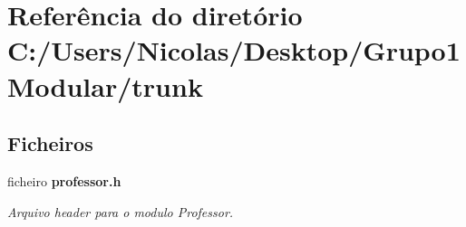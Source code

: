 \section{Referência do diretório C\+:/\+Users/\+Nicolas/\+Desktop/\+Grupo1\+Modular/trunk}
\label{dir_3dc9b3319109d7c1da273b4952c05982}
\subsection*{Ficheiros}
\begin{DoxyCompactItemize}
\item 
ficheiro \textbf{ professor.\+h}
\begin{DoxyCompactList}\small\item\em Arquivo header para o modulo Professor. \end{DoxyCompactList}\end{DoxyCompactItemize}
